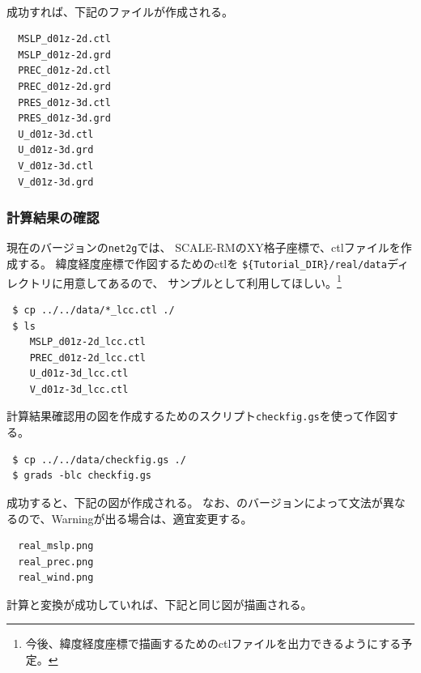 \\

成功すれば、下記のファイルが作成される。
\begin{verbatim}
  MSLP_d01z-2d.ctl
  MSLP_d01z-2d.grd
  PREC_d01z-2d.ctl
  PREC_d01z-2d.grd
  PRES_d01z-3d.ctl
  PRES_d01z-3d.grd
  U_d01z-3d.ctl
  U_d01z-3d.grd
  V_d01z-3d.ctl
  V_d01z-3d.grd
\end{verbatim}


\subsubsection{計算結果の確認}
現在のバージョンの\verb|net2g|では、
SCALE-RMのXY格子座標で、ctlファイルを作成する。
緯度経度座標で作図するためのctlを
\verb|${Tutorial_DIR}/real/data|ディレクトリに用意してあるので、
サンプルとして利用してほしい。\footnote{今後、緯度経度座標で描画するためのctlファイルを出力できるようにする予定。}
\begin{verbatim}
 $ cp ../../data/*_lcc.ctl ./
 $ ls
    MSLP_d01z-2d_lcc.ctl
    PREC_d01z-2d_lcc.ctl
    U_d01z-3d_lcc.ctl
    V_d01z-3d_lcc.ctl
\end{verbatim}

計算結果確認用の図を作成するための\grads スクリプト\verb|checkfig.gs|を使って作図する。
\begin{verbatim}
 $ cp ../../data/checkfig.gs ./
 $ grads -blc checkfig.gs
\end{verbatim}
成功すると、下記の図が作成される。
なお、\grads のバージョンによって文法が異なるので、Warningが出る場合は、適宜変更する。
\begin{verbatim}
  real_mslp.png
  real_prec.png
  real_wind.png
\end{verbatim}
計算と変換が成功していれば、下記と同じ図が描画される。

